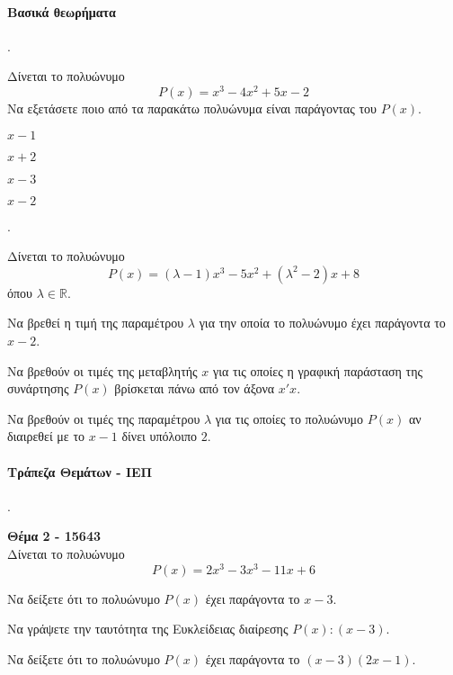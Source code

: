 \documentclass[11pt,a4paper,twocolumn]{article}
\newcounter{askhsh}
\newcommand{\askhsh}{{\large\theaskhsh.}\ \addtocounter{askhsh}{1}}
\begin{document}
\paragraph{Βασικά θεωρήματα}
\askhsh Δίνεται το πολυώνυμο
\[ P(x)=x^3-4x^2+5x-2 \]
Να εξετάσετε ποιο από τα παρακάτω πολυώνυμα είναι παράγοντας του $P(x)$.
\begin{multicols}{4}
\begin{alist}
\item $x-1$
\item $x+2$
\item $x-3$
\item $x-2$
\end{alist}
\end{multicols}
\askhsh Δίνεται το πολυώνυμο \[ P(x)=(\lambda-1)x^3-5x^2+(\lambda^2-2)x+8 \] όπου $ \lambda\in\mathbb{R} $.
\begin{alist}
\item Να βρεθεί η τιμή της παραμέτρου $ \lambda $ για την οποία το πολυώνυμο έχει παράγοντα το $ x-2 $.
\item Να βρεθούν οι τιμές της μεταβλητής $ x $ για τις οποίες η γραφική παράσταση της συνάρτησης $ P(x) $ βρίσκεται πάνω από τον άξονα $ x'x $.
\item Να βρεθούν οι τιμές της παραμέτρου $ \lambda $ για τις οποίες το πολυώνυμο $ P(x) $ αν διαιρεθεί με το $ x-1 $ δίνει υπόλοιπο $ 2 $.
\end{alist}
\paragraph{Τράπεζα Θεμάτων - ΙΕΠ}
\askhsh \textbf{Θέμα 2 - 15643}\\
Δίνεται το πολυώνυμο
\[ P(x)=2x^3-3x^3-11x+6 \]
\begin{alist}
\item \begin{rlist}
\item Να δείξετε ότι το πολυώνυμο $P(x)$ έχει παράγοντα το $x-3$.
\item Να γράψετε την ταυτότητα της Ευκλείδειας διαίρεσης $P(x):(x-3)$.
\end{rlist}
\item Να δείξετε ότι το πολυώνυμο $P(x)$ έχει παράγοντα το $(x-3)(2x-1)$.
\end{alist}
\end{document}
